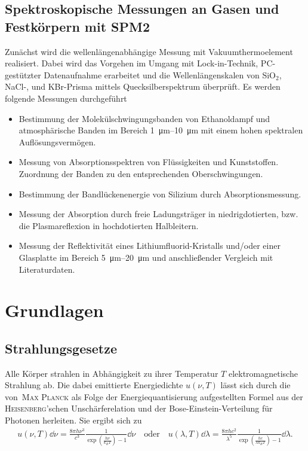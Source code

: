 \documentclass[a4paper,twoside,final]{article}
\begin{document}
\subsection{Spektroskopische Messungen an Gasen und Festkörpern mit SPM2}
Zunächst wird die wellenlängenabhängige Messung mit Vakuumthermoelement realisiert. Dabei wird das Vorgehen im Umgang mit Lock-in-Technik, PC-gestützter Datenaufnahme erarbeitet und die Wellenlängenskalen von SiO$_2$, NaCl-, und KBr-Prisma mittels Quecksilberspektrum überprüft. Es werden folgende Messungen durchgeführt
\begin{itemize}
  \item Bestimmung der Molekülschwingungsbanden von Ethanoldampf und atmosphärische Banden im Bereich \SIrange{1}{10}{\micro\metre} mit einem hohen spektralen Auflösungsvermögen.
  \item Messung von Absorptionsspektren von Flüssigkeiten und Kunststoffen. Zuordnung der Banden zu den entsprechenden Oberschwingungen.
  \item Bestimmung der Bandlückenenergie von Silizium durch Absorptionsmessung.
  \item Messung der Absorption durch freie Ladungsträger in niedrigdotierten, bzw. die Plasmareflexion in hochdotierten Halbleitern.
  \item Messung der Reflektivität eines Lithiumfluorid-Kristalls und/oder einer Glasplatte im Bereich \SIrange{5}{20}{\micro\metre} und anschließender Vergleich mit Literaturdaten.
\end{itemize}

\newpage
\section{Grundlagen} \label{sec:Grundlagen}
\subsection{Strahlungsgesetze}
Alle Körper strahlen in Abhängigkeit zu ihrer Temperatur $T$ elektromagnetische Strahlung ab. Die dabei emittierte Energiedichte $u(\nu,T)$ lässt sich durch die von~\textsc{Max Planck} als Folge der Energiequantisierung aufgestellten Formel aus der \textsc{Heisenberg}'schen Unschärferelation und der Bose-Einstein-Verteilung für Photonen herleiten. Sie ergibt sich zu
\begin{align}\label{eqn:2.1}
    u(\nu,T)\dd{\nu} = \frac{8\pi h \nu^3}{c^3}\frac{1}{\exp(\frac{h\nu}{k_B T})-1}\dd{\nu} \quad\text{oder}\quad u(\lambda,T)\dd{\lambda} = \frac{8\pi h c^2}{\lambda^5}\frac{1}{\exp(\frac{hc}{\lambda k_B T})-1}\dd{\lambda}.
\end{align}
\end{document}
